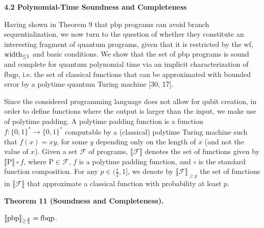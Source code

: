  
 
 
 
\par\medskip\noindent\textbf{4.2 Polynomial-Time Soundness and Completeness}\par
 
 
Having shown in Theorem 9 that pbp programs can avoid branch sequentialization, we now turn to the question of whether they constitute an interesting fragment of quantum programs, given that it is restricted by the wf, $\textnormal{{width}}_{\leq 1}$ and basic conditions. We show that the set of pbp programs is sound and complete for quantum polynomial time via an implicit characterization of fbqp, i.e. the set of classical functions that can be approximated with bounded error by a polytime quantum Turing machine [30, 17].\par
 
 
 
Since the considered programming language does not allow for qubit creation, in order to define functions where the output is larger than the input, we make use of polytime padding. A polytime padding function is a function $f:\{0,1\}^{\ast}\to\{0,1\}^{\ast}$ computable by a (classical) polytime Turing machine such that $f(x)=xy$, for some $y$ depending only on the length of $x$ (and not the value of $x$). Given a set $\mathcal{F}$ of programs, $\llbracket\mathcal{F}\rrbracket$ denotes the set of functions given by $\llbracket\mathrm{P}\rrbracket\circ f$, where $\mathrm{P}\in\mathcal{F}$, $f$ is a polytime padding function, and $\circ$ is the standard function composition. For any $p\in(\frac{1}{2},1]$, we denote by $\llbracket\mathcal{F}\rrbracket_{\geq p}$ the set of functions in $\llbracket\mathcal{F}\rrbracket$ that approximate a classical function with probability at least $p$.\par
 
 
 
\par\medskip\noindent\textbf{Theorem 11 (Soundness and Completeness).}\par
 
 
$\llbracket\textnormal{{pbp}}{}\rrbracket_{\geq\frac{2}{3}}=\textnormal{{fbqp}}{}$.\par
 
